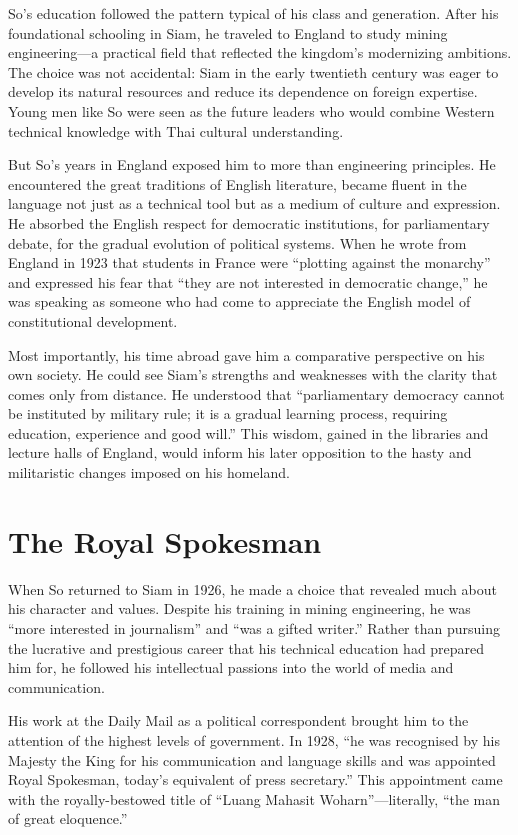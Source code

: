 \documentclass[
  Letterpaper,
]{scrbook}
\begin{document}
So's education followed the pattern typical of his class and generation.
After his foundational schooling in Siam, he traveled to England to
study mining engineering---a practical field that reflected the
kingdom's modernizing ambitions. The choice was not accidental: Siam in
the early twentieth century was eager to develop its natural resources
and reduce its dependence on foreign expertise. Young men like So were
seen as the future leaders who would combine Western technical knowledge
with Thai cultural understanding.

But So's years in England exposed him to more than engineering
principles. He encountered the great traditions of English literature,
became fluent in the language not just as a technical tool but as a
medium of culture and expression. He absorbed the English respect for
democratic institutions, for parliamentary debate, for the gradual
evolution of political systems. When he wrote from England in 1923 that
students in France were ``plotting against the monarchy'' and expressed
his fear that ``they are not interested in democratic change,'' he was
speaking as someone who had come to appreciate the English model of
constitutional development.

Most importantly, his time abroad gave him a comparative perspective on
his own society. He could see Siam's strengths and weaknesses with the
clarity that comes only from distance. He understood that
``parliamentary democracy cannot be instituted by military rule; it is a
gradual learning process, requiring education, experience and good
will.'' This wisdom, gained in the libraries and lecture halls of
England, would inform his later opposition to the hasty and militaristic
changes imposed on his homeland.

\section{The Royal Spokesman}\label{the-royal-spokesman}

When So returned to Siam in 1926, he made a choice that revealed much
about his character and values. Despite his training in mining
engineering, he was ``more interested in journalism'' and ``was a gifted
writer.'' Rather than pursuing the lucrative and prestigious career that
his technical education had prepared him for, he followed his
intellectual passions into the world of media and communication.

His work at the Daily Mail as a political correspondent brought him to
the attention of the highest levels of government. In 1928, ``he was
recognised by his Majesty the King for his communication and language
skills and was appointed Royal Spokesman, today's equivalent of press
secretary.'' This appointment came with the royally-bestowed title of
``Luang Mahasit Woharn''---literally, ``the man of great eloquence.''
\end{document}

